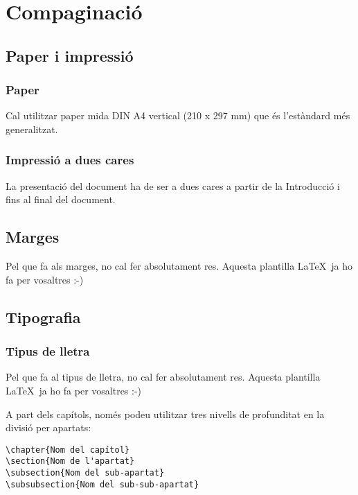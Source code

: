 \chapter{Compaginació}\label{C:compaginacio}

\section{Paper i impressió}

\subsection{Paper}

Cal utilitzar paper mida DIN A4 vertical (210 x 297 mm)  que és l'estàndard més generalitzat.

\subsection{Impressió a dues cares}

La presentació del document ha de ser a dues cares a partir de la Introducció i fins al final del document.


\section{Marges}

Pel que fa als marges, no cal fer absolutament res. Aquesta plantilla \LaTeX \ ja ho fa per vosaltres :-)


\section{Tipografia}

\subsection{Tipus de lletra}

Pel que fa al tipus de lletra, no cal fer absolutament res. Aquesta plantilla \LaTeX \ ja ho fa per vosaltres :-)

A part dels capítols, només podeu utilitzar tres nivells de profunditat en la divisió per apartats:

\begin{verbatim}
\chapter{Nom del capítol}
\section{Nom de l'apartat}
\subsection{Nom del sub-apartat}
\subsubsection{Nom del sub-sub-apartat}
\end{verbatim}



